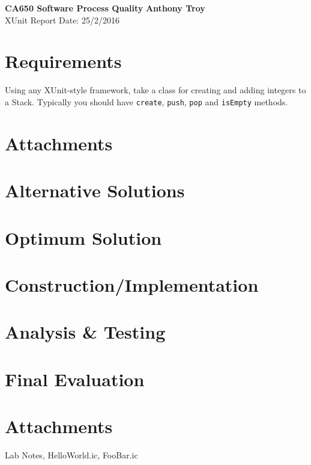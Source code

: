 \documentclass[a4paper, 11pt]{article}
\begin{document}
\noindent
\large\textbf{CA650 Software Process Quality}  \hfill \textbf{Anthony Troy} \\
\normalsize XUnit Report \hfill Date: 25/2/2016

\section*{Requirements}
Using any XUnit-style framework, take a class for creating and adding integers to a Stack. Typically you should have \lstinline$create$,  \lstinline$push$,  \lstinline$pop$ and  \lstinline$isEmpty$ methods.

\section*{Attachments}
\lipsum[2]

\section*{Alternative Solutions}
\lipsum[3]

\section*{Optimum Solution}
\lipsum[4]

\section*{Construction/Implementation}
\lipsum[5]

\section*{Analysis \& Testing}
\lipsum[6]

\section*{Final Evaluation}
\lipsum[7]

\section*{Attachments}
Lab Notes, HelloWorld.ic, FooBar.ic
\end{document}
